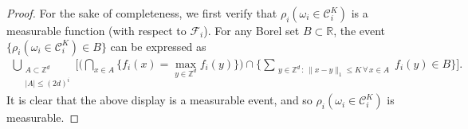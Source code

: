\documentclass[11pt,reqno]{amsart}
\numberwithin{equation}{section}
\theoremstyle{definition}
\begin{document}
\begin{proof}
For the sake of completeness, we first verify that $\rho_i(\omega_i \in {\mathcal{C}}_i^K)$ is a measurable function (with respect to ${\mathcal{F}}_i$).
For any Borel set $B \subset {\mathbb{R}}$, the event $\{\rho_i(\omega_i \in {\mathcal{C}}_i^K) \in B\}$ can be expressed as
{\begin{align*} {
\bigcup_{\substack{A \subset {\mathbb{Z}}^d \\ |A| \leq (2d)^i}} \Bigg[\bigg(\bigcap_{x \in A} \{f_i(x) = \max_{y\in{\mathbb{Z}}^d} f_i(y)\}\bigg) \cap
\bigg\{\sum_{\substack{y \in {\mathbb{Z}}^d\, :\, \|x - y\|_1 \leq K\, \forall\, x \in A }} f_i(y) \in B\bigg\}\Bigg].
} \end{align*}}
It is clear that the above display is a measurable event, and so $\rho_i(\omega_i \in {\mathcal{C}}_i^K)$ is measurable.


\end{proof}
\end{document}
